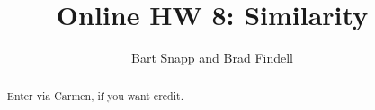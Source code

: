 \documentclass[handout,space,nooutcomes]{xourse}
\title{Online HW 8: Similarity}
\author{Bart Snapp and Brad Findell}
\begin{document}
\begin{abstract}
Enter via Carmen, if you want credit.  
\end{abstract}
\maketitle

{}
\end{document}
